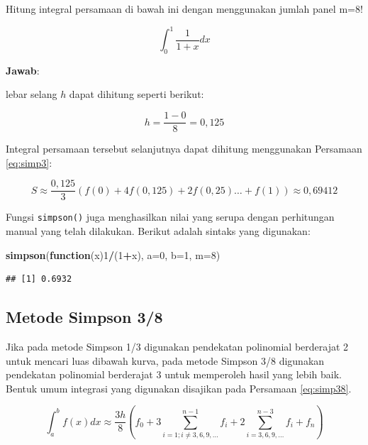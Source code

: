 \documentclass[]{book}
\newenvironment{Shaded}{\begin{snugshade}}{\end{snugshade}}
\newcommand{\ControlFlowTok}[1]{\textcolor[rgb]{0.13,0.29,0.53}{\textbf{#1}}}
\newcommand{\DataTypeTok}[1]{\textcolor[rgb]{0.13,0.29,0.53}{#1}}
\newcommand{\DecValTok}[1]{\textcolor[rgb]{0.00,0.00,0.81}{#1}}
\newcommand{\KeywordTok}[1]{\textcolor[rgb]{0.13,0.29,0.53}{\textbf{#1}}}
\newcommand{\NormalTok}[1]{#1}
\newcommand{\OperatorTok}[1]{\textcolor[rgb]{0.81,0.36,0.00}{\textbf{#1}}}
\theoremstyle{definition}
\theoremstyle{definition}
\theoremstyle{definition}
\theoremstyle{remark}
\let\BeginKnitrBlock\begin \let\EndKnitrBlock\end
\begin{document}
\BeginKnitrBlock{example}
\protect\hypertarget{exm:simpexm}{}{\label{exm:simpexm} }Hitung integral persamaan di bawah ini dengan menggunakan jumlah panel m=8!
\EndKnitrBlock{example}

\[
\int_{0}^1 \frac{1}{1+x}dx
\]

\textbf{Jawab}:

lebar selang \(h\) dapat dihitung seperti berikut:

\[
h = \frac{1-0}{8}=0,125
\]

Integral persamaan tersebut selanjutnya dapat dihitung menggunakan Persamaan \eqref{eq:simp3}:

\[
S\approx\frac{0,125}{3}\left(f\left(0\right)+4f\left(0,125\right)+2f\left(0,25\right)\dots+f\left(1\right)\right)\approx 0,69412
\]

Fungsi \texttt{simpson()} juga menghasilkan nilai yang serupa dengan perhitungan manual yang telah dilakukan. Berikut adalah sintaks yang digunakan:

\begin{Shaded}
\begin{Highlighting}[]
\KeywordTok{simpson}\NormalTok{(}\ControlFlowTok{function}\NormalTok{(x)}\DecValTok{1}\OperatorTok{/}\NormalTok{(}\DecValTok{1}\OperatorTok{+}\NormalTok{x), }\DataTypeTok{a=}\DecValTok{0}\NormalTok{, }\DataTypeTok{b=}\DecValTok{1}\NormalTok{, }\DataTypeTok{m=}\DecValTok{8}\NormalTok{)}
\end{Highlighting}
\end{Shaded}

\begin{verbatim}
## [1] 0.6932
\end{verbatim}

\hypertarget{simpson38}{%
\subsection{Metode Simpson 3/8}\label{simpson38}}

Jika pada metode Simpson 1/3 digunakan pendekatan polinomial berderajat 2 untuk mencari luas dibawah kurva, pada metode Simpson 3/8 digunakan pendekatan polinomial berderajat 3 untuk memperoleh hasil yang lebih baik. Bentuk umum integrasi yang digunakan disajikan pada Persamaan \eqref{eq:simp38}.

\begin{equation}
\int_a^bf\left(x\right)dx\approx\frac{3h}{8}\left(f_0+3\sum_{i=1;i\ne3,6,9,\dots}^{n-1}f_i+2\sum_{i=3,6,9,\dots}^{n-3}f_i+f_n\right)
  \label{eq:simp38}
\end{equation}
\end{document}
